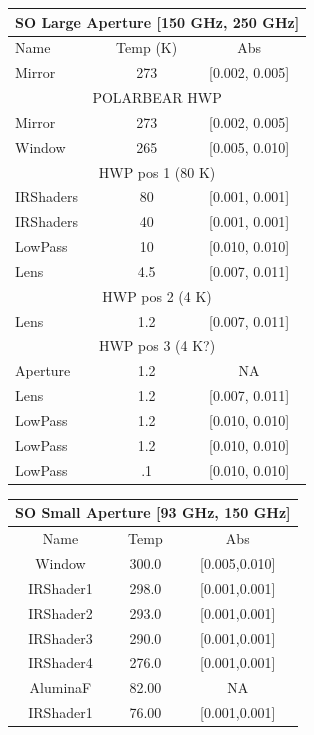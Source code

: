 \documentclass{article}
\theoremstyle{remark}
\begin{document}
\begin{table}

\centering
\begin{tabular}{ |l|c|c|} 
	\hline
	\multicolumn{3}{|c|}{SO Large Aperture [150 GHz, 250 GHz]}\\
	\hline
	 Name 		& Temp (K)	& Abs 		\\ \hline
	 Mirror 	&	273		& [0.002, 0.005] 	\\
	 \hline \multicolumn{3}{|c|}{POLARBEAR HWP }	\\ \hline
	 Mirror 	&	273		& [0.002, 0.005]	\\
	 Window 	&	265		& [0.005, 0.010] 	 \\
	 \hline \multicolumn{3}{|c|}{HWP pos 1 (80 K)}	\\ \hline
	 IRShaders 	&	80		& [0.001, 0.001]	\\
	 IRShaders 	&	40		& [0.001, 0.001]	\\
	 LowPass 	&	10		& [0.010, 0.010] 	\\
	 Lens 		&	4.5		& [0.007, 0.011] 	 \\
	 \hline \multicolumn{3}{|c|}{HWP pos 2 (4 K)}	\\ \hline
	 Lens 		&	1.2		& [0.007, 0.011] 	 \\
	 \hline \multicolumn{3}{|c|}{HWP pos 3 (4 K?)}	\\ \hline
	 Aperture 	&	1.2		&  NA  			 	\\
	 Lens 		&	1.2		& [0.007, 0.011] 	 \\
	 LowPass 	&	1.2		& [0.010, 0.010] 	 \\
	 LowPass 	&	1.2		& [0.010, 0.010] 	 \\
	 LowPass 	&	.1		& [0.010, 0.010] 	 \\
	\hline	
\end{tabular}
\!
\begin{tabular}{|c|c|c|}
\hline
\multicolumn{3}{|c|}{SO Small Aperture [93 GHz, 150 GHz]}\\
\hline
Name & Temp & Abs \\
\hline
Window		& 300.0  & [0.005,0.010]	\\
IRShader1	& 298.0  & [0.001,0.001]	\\
IRShader2	& 293.0  & [0.001,0.001]	\\
IRShader3	& 290.0  & [0.001,0.001]	\\
IRShader4	& 276.0  & [0.001,0.001]	\\
AluminaF	& 82.00  &  NA			  	\\
IRShader1	& 76.00  & [0.001,0.001]	\\

\end{tabular}
\end{table}
\end{document}
